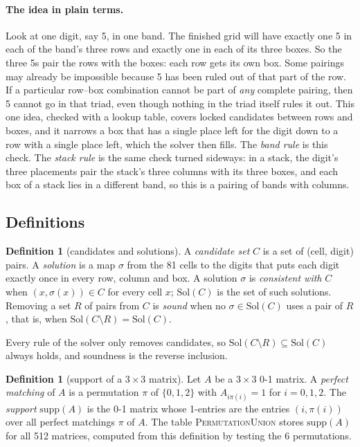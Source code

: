 \documentclass[11pt]{article}
\theoremstyle{definition}
\newtheorem{definition}[theorem]{Definition}
\theoremstyle{plain}
\let\origtextsc\textsc
\renewcommand{\textsc}[1]{\textup{\origtextsc{#1}}}
\begin{document}
\paragraph{The idea in plain terms.} Look at one digit, say 5, in one band. The finished grid will have exactly one 5
in each of the band's three rows and exactly one in each of its three boxes. So the three 5s pair the rows with the
boxes: each row gets its own box. Some pairings may already be impossible because 5 has been ruled out of that part of
the row. If a particular row--box combination cannot be part of \emph{any} complete pairing, then 5 cannot go in that
triad, even though nothing in the triad itself rules it out. This one idea, checked with a lookup table,
covers locked candidates between rows and boxes, and it narrows a box that has a single place left for the digit down
to a row with a single place left, which the solver then fills. The \emph{band rule} is this check. The \emph{stack rule} is the same check turned sideways: in a stack, the
digit's three placements pair the stack's three columns with its three boxes, and each box of a stack lies in a
different band, so this is a pairing of bands with columns.

\subsection{Definitions}

\begin{definition}[candidates and solutions]
A \emph{candidate set} $C$ is a set of (cell, digit) pairs. A \emph{solution} is a map $\sigma$ from the 81 cells to the
digits that puts each digit exactly once in every row, column and box. A solution $\sigma$ is \emph{consistent with}
$C$ when $(x,\sigma(x))\in C$ for every cell $x$; $\mathrm{Sol}(C)$ is the set of such solutions. Removing a set $R$ of
pairs from $C$ is \emph{sound} when no $\sigma\in\mathrm{Sol}(C)$ uses a pair of $R$, that is, when
$\mathrm{Sol}(C\setminus R)=\mathrm{Sol}(C)$.
\end{definition}

Every rule of the solver only removes candidates, so $\mathrm{Sol}(C\setminus R)\subseteq\mathrm{Sol}(C)$ always holds, and
soundness is the reverse inclusion.

\begin{definition}[support of a $3\times 3$ matrix]
Let $A$ be a $3\times 3$ 0-1 matrix. A \emph{perfect matching} of $A$ is a permutation $\pi$ of $\{0,1,2\}$ with
$A_{i\pi(i)}=1$ for $i=0,1,2$. The \emph{support} $\mathrm{supp}(A)$ is the 0-1 matrix whose 1-entries are the entries
$(i,\pi(i))$ over all perfect matchings $\pi$ of $A$. The table \textsc{PermutationUnion} stores $\mathrm{supp}(A)$ for all
512 matrices, computed from this definition by testing the 6 permutations.
\end{definition}
\end{document}
